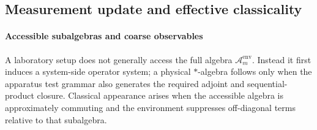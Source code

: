 \documentclass[12pt,a4paper]{article}
\begin{document}
\subsection{Measurement update and effective classicality}
\label{p4:sec:part2-classicality}



\paragraph{Accessible subalgebras and coarse observables}
\label{p4:sec:part2-coarse-subalgebras}

A laboratory setup does not generally access the full algebra $\mathcal A_m^{\mathrm{env}}$.
Instead it first induces a system-side operator system; a physical
\(*\)-algebra follows only when the apparatus test grammar also generates the
required adjoint and sequential-product closure.
Classical appearance arises when the accessible algebra is approximately commuting and the environment suppresses off-diagonal terms relative to that subalgebra.
\end{document}
